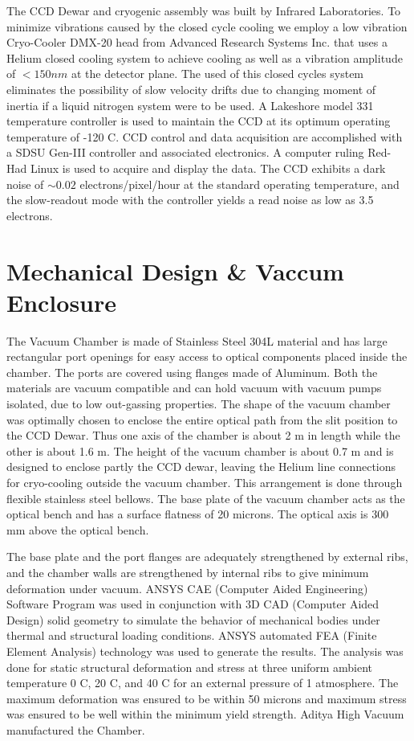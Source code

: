\documentclass[12pt,preprint]{emulateapj}
\begin{document}
The CCD Dewar and cryogenic assembly was built by Infrared Laboratories. To minimize vibrations caused by the closed cycle cooling we employ a low vibration Cryo-Cooler DMX-20 head  from Advanced Research Systems Inc. that uses a Helium closed cooling system to achieve cooling as well as a vibration amplitude of $< 150 nm$ at the detector plane. The used of this closed cycles system eliminates the possibility of slow velocity drifts due to changing moment of inertia if a liquid nitrogen system were to be used.  A Lakeshore model 331 temperature controller is used to maintain the CCD at its optimum operating temperature of -120 C. CCD control and data acquisition are accomplished with a SDSU Gen-III controller and associated electronics.  A computer ruling Red-Had Linux is used to acquire and display the data. The CCD exhibits a dark noise of $\sim 0.02$ electrons/pixel/hour at the standard operating temperature, and the slow-readout mode with the controller yields a read noise as low as 3.5 electrons.

\section{Mechanical Design \& Vaccum Enclosure}
The Vacuum Chamber is made of Stainless Steel 304L material and has large rectangular port openings for easy access to optical components placed inside the chamber.  The ports are covered using flanges made of Aluminum.  Both the materials are vacuum compatible and can hold vacuum with vacuum pumps isolated, due to low out-gassing properties. The shape of the vacuum chamber was optimally chosen to enclose the entire optical path from the slit position to the CCD Dewar.  Thus one axis of the chamber is about 2 m in length while the other is about 1.6 m.  The height of the vacuum chamber is about 0.7 m and is designed to enclose partly the CCD dewar, leaving the Helium line connections for cryo-cooling outside the vacuum chamber. This arrangement is done through flexible stainless steel bellows.  The base plate of the vacuum chamber acts as the optical bench and has a surface flatness of 20 microns.  The optical axis is 300 mm above the optical bench.

The base plate and the port flanges are adequately strengthened by external ribs, and the chamber walls are strengthened by internal ribs to give minimum deformation under vacuum.  ANSYS CAE (Computer Aided Engineering) Software Program was used in conjunction with 3D CAD (Computer Aided Design) solid geometry to simulate the behavior of mechanical bodies under thermal and structural loading conditions.  ANSYS automated FEA (Finite Element Analysis) technology was used to generate the results. The analysis was done for static structural deformation and stress at three uniform ambient temperature 0 C, 20 C, and 40 C for an external pressure of 1 atmosphere. The maximum deformation was ensured to be within 50 microns and maximum stress was ensured to be well within the minimum yield strength. Aditya High Vacuum manufactured the Chamber.
\end{document}
